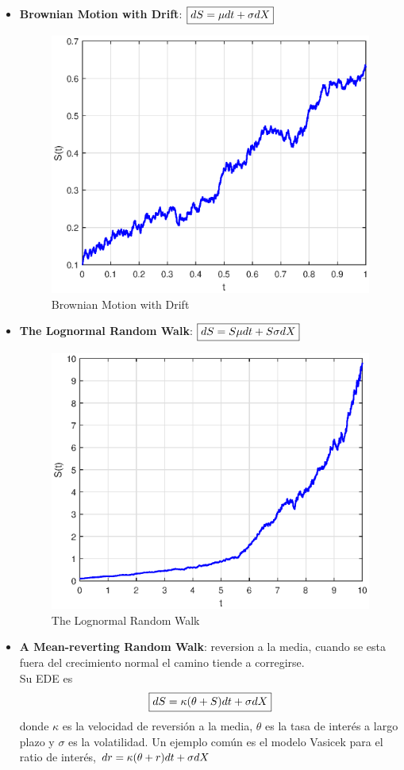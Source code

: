 \begin{itemize}
    \item \textbf{Brownian Motion with Drift}: $\boxed{dS = \mu dt + \sigma d\mathnormal{X}}$
    \begin{figure}[H]
        \centering
        \includegraphics[width=0.65\linewidth]{Imagenes/Parte1/3_Aleatoriedad/BrownianMotionDrift.eps}
        \caption{Brownian Motion with Drift}
    \end{figure}
    \item \textbf{The Lognormal Random Walk}: $\boxed{dS = S\mu dt + S\sigma d\mathnormal{X}}$
    \begin{figure}[H]
        \centering
        \includegraphics[width=0.65\linewidth]{Imagenes/Parte1/3_Aleatoriedad/LognormalRandomWalk.eps}
        \caption{The Lognormal Random Walk}
    \end{figure}
    \item \textbf{A Mean-reverting Random Walk}: reversion a la media, cuando se esta fuera del crecimiento normal el camino tiende a corregirse.\\
    Su EDE es 
    \[
        \boxed{dS = \kappa(\theta+S) dt + \sigma d\mathnormal{X}}
    \]
    donde $\kappa$ es la velocidad de reversión a la media, $\theta$ es la tasa de interés a largo plazo y $\sigma$ es la volatilidad. Un ejemplo común es el modelo Vasicek para el ratio de interés, $dr = \kappa(\theta+r) dt + \sigma d\mathnormal{X}$

\end{itemize}

